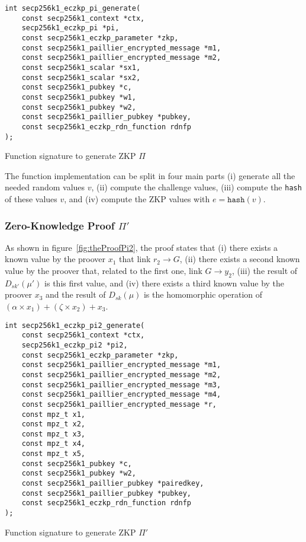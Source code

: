 \begin{listing}
  \begin{verbatim}
int secp256k1_eczkp_pi_generate(
    const secp256k1_context *ctx,
    secp256k1_eczkp_pi *pi,
    const secp256k1_eczkp_parameter *zkp,
    const secp256k1_paillier_encrypted_message *m1,
    const secp256k1_paillier_encrypted_message *m2,
    const secp256k1_scalar *sx1,
    const secp256k1_scalar *sx2,
    const secp256k1_pubkey *c,
    const secp256k1_pubkey *w1,
    const secp256k1_pubkey *w2,
    const secp256k1_paillier_pubkey *pubkey,
    const secp256k1_eczkp_rdn_function rdnfp
);
  \end{verbatim}
	\caption{Function signature to generate ZKP $\Pi$}
	\label{lst:funcSigGeneratePi}
\end{listing}

The function implementation can be split in four main parts (i) generate all
the needed random values $v$, (ii) compute the challenge values, (iii) compute
the \texttt{hash} of these values $v$, and (iv) compute the ZKP values with $e =
\texttt{hash}(v)$.

\subsubsection{Zero-Knowledge Proof $\Pi'$}

As shown in figure~\ref{fig:theProofPi2}, the proof states that (i) there exists a
known value by the proover $x_1$ that link $r_2 \rightarrow G$, (ii) there exists a
second known value by the proover that, related to the first one, link $G
\rightarrow y_2$, (iii) the result of $D_{sk'}(\mu')$ is this first value, and
(iv) there exists a third known value by the proover $x_3$ and the result of
$D_{sk}(\mu)$ is the homomorphic operation of $(\alpha \times x_1) + (\zeta
\times x_2) + x_3$.

\begin{listing}
  \begin{verbatim}
int secp256k1_eczkp_pi2_generate(
    const secp256k1_context *ctx,
    secp256k1_eczkp_pi2 *pi2,
    const secp256k1_eczkp_parameter *zkp,
    const secp256k1_paillier_encrypted_message *m1,
    const secp256k1_paillier_encrypted_message *m2,
    const secp256k1_paillier_encrypted_message *m3,
    const secp256k1_paillier_encrypted_message *m4,
    const secp256k1_paillier_encrypted_message *r,
    const mpz_t x1,
    const mpz_t x2,
    const mpz_t x3,
    const mpz_t x4,
    const mpz_t x5,
    const secp256k1_pubkey *c,
    const secp256k1_pubkey *w2,
    const secp256k1_paillier_pubkey *pairedkey,
    const secp256k1_paillier_pubkey *pubkey,
    const secp256k1_eczkp_rdn_function rdnfp
);
  \end{verbatim}
	\caption{Function signature to generate ZKP $\Pi'$}
	\label{lst:funcSigGeneratePi2}
\end{listing}

